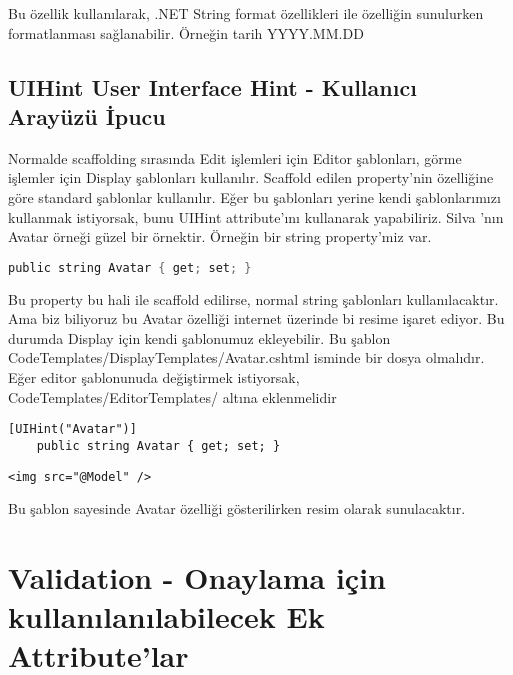 \documentclass[10pt,a4paper]{article}
\begin{document}
Bu özellik kullanılarak, .NET String format özellikleri ile özelliğin sunulurken formatlanması sağlanabilir.
Örneğin tarih YYYY.MM.DD


\subsection{UIHint User Interface Hint - Kullanıcı Arayüzü İpucu}

Normalde scaffolding sırasında Edit işlemleri için Editor şablonları,
görme işlemler için Display şablonları kullanılır.
Scaffold edilen property'nin özelliğine göre standard şablonlar kullanılır.
Eğer bu şablonları yerine kendi şablonlarımızı kullanmak istiyorsak,
bunu UIHint attribute'ını kullanarak yapabiliriz.
Silva \cite{Silva2010Quick}'nın Avatar örneği güzel bir örnektir.
Örneğin bir string property'miz var.

\begin{lstlisting}[label=code-UIHintOrnek1,caption=UIHint Örnek1,language=C]
	public string Avatar { get; set; }
\end{lstlisting}

Bu property bu hali ile scaffold edilirse, normal string şablonları kullanılacaktır.
Ama biz biliyoruz bu Avatar özelliği internet üzerinde bi resime işaret ediyor.
Bu durumda Display için kendi şablonumuz ekleyebilir.
Bu şablon CodeTemplates/DisplayTemplates/Avatar.cshtml isminde bir dosya olmalıdır.
Eğer editor şablonunuda değiştirmek istiyorsak,  CodeTemplates/EditorTemplates/ altına eklenmelidir


\begin{lstlisting}[label=code-UIHintOrnek1,caption=UIHint Örnek1]
	[UIHint("Avatar")]
	public string Avatar { get; set; }
\end{lstlisting}


\begin{lstlisting}[label=code-UIHintOrnek cshtml,caption=UIHint cshtml]
	<img src="@Model" />
\end{lstlisting}

Bu şablon sayesinde Avatar özelliği gösterilirken resim olarak sunulacaktır.



\section{Validation - Onaylama için kullanılanılabilecek Ek Attribute'lar}
\end{document}
